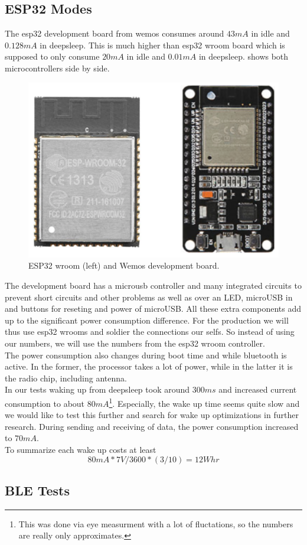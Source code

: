 \subsection{ESP32 Modes}
The esp32 development board from wemos consumes around $43mA$ in idle and $0.128mA$ in deepsleep. This is much higher than esp32 wroom board which is supposed to only consume $20mA$ in idle and $0.01mA$ in deepsleep\cite{InsightI15esp32ModesWroom:online}.  shows both microcontrollers side by side. 

\begin{figure}[H!]
    \centering
    \includegraphics[scale=0.4]{figures/esp32-wroom-wemos.png}%
    \caption{ESP32 wroom (left) and Wemos development board.}\label{fig:esp32Comp}
\end{figure}

The development board has a microusb controller and many integrated circuits to prevent short circuits and other problems as well as over an LED, microUSB in and buttons for reseting and power of microUSB. All these extra components add up to the significant power consumption difference. For the production we will thus use esp32 wrooms and soldier the connections our selfs. So instead of using our numbers, we will use the numbers from the esp32 wroom controller.\\

The power consumption also changes during boot time and while bluetooth is active. In the former, the processor takes a lot of power, while in the latter it is the radio chip, including antenna. \\

In our tests waking up from deepsleep took around $300ms$ and increased current consumption to about $80mA$\footnote{This was done via eye measurment with a lot of fluctations, so the numbers are really only approximates.}. Especially, the wake up time seems quite slow and we would like to test this further and search for wake up optimizations in further research.
During sending and receiving of data, the power consumption increased to $70mA$.\\

To summarize each wake up costs at least
\begin{equation*}
    80mA * 7V / 3600 * (3/10) = 12Whr
\end{equation*}




\subsection{BLE Tests}